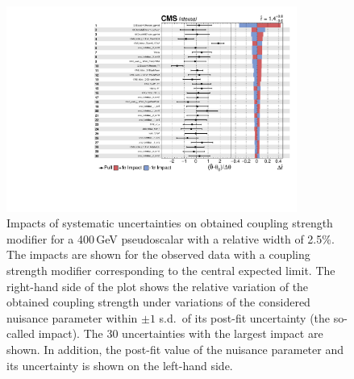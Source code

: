 \begin{figure}[!Hhtb]
\centering
\includegraphics[width=0.85\textwidth,keepaspectratio=true]{fig/app5/impacts/impacts_400_obs.pdf}
\caption{Impacts of systematic uncertainties on obtained coupling strength modifier for a 400\,GeV pseudoscalar with a relative width of 2.5\%. The impacts are shown for the observed data with a coupling strength modifier corresponding to the central expected limit. The right-hand side of the plot shows the relative variation of the obtained coupling strength under variations of the considered nuisance parameter within $\pm 1$ s.d.\ of its post-fit uncertainty (the so-called impact). The 30 uncertainties with the largest impact are shown. In addition, the post-fit value of the nuisance parameter and its uncertainty is shown on the left-hand side.}
\label{fig:impacts_obs_m400}
\end{figure}

